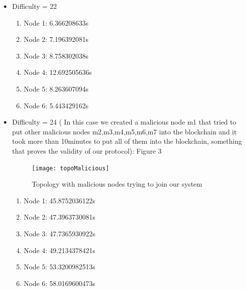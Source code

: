 \documentclass[twocolumn]{article}
\begin{document}
\begin{itemize}
\begin{enumerate}
        \end{enumerate}
    \item Difficulty = 22
        \begin{enumerate}
        \item Node 1: 6.366208633s
        \item Node 2: 7.196392081s	
        \item Node 3: 8.758302038s
        \item Node 4: 12.692505636s
        \item Node 5: 8.263607094s
        \item Node 6: 5.443429162s
        \end{enumerate}
    \item Difficulty = 24 ( In this case we created a malicious node m1 that tried to put other malicious nodes m2,m3,m4,m5,m6,m7 into the blockchain and it took more than 10minutes to put all of them into the blockchain, something that proves the validity of our protocol): Figure 3
    \begin{figure}[h]
	\caption{Topology with malicious nodes trying to join our system}
	\centering
	\texttt{[image: topoMalicious]}
	\label{fig:topoMalicious}
	\end{figure}
        \begin{enumerate}
        \item Node 1: 45.8752036122s 
        \item Node 2: 47.3963730081s
        \item Node 3: 47.7365930922s
        \item Node 4: 49.2134378421s
        \item Node 5: 53.3200982513s
        \item Node 6: 58.0169600473s
        \end{enumerate}
\end{itemize}

\printbibliography
\end{document}
